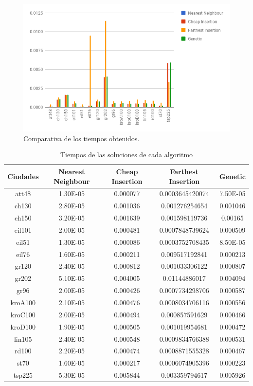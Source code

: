 \documentclass{article}
\begin{document}
\begin{figure}[H]
  \centering
  \includegraphics[width=1\textwidth]{tiempos.png}
  \caption{Comparativa de los tiempos obtenidos.}
\end{figure}

\begin{table}[h]
  \centering
  \begin{tabular}{|c|c|c|c|c|}
    \hline
		Ciudades & Nearest Neighbour & Cheap Insertion & Farthest Insertion & Genetic \\ \hline
		att48 & 1.30E-05 & 0.000077 & 0.0003645420074 & 7.50E-05 \\
		ch130 & 2.80E-05 & 0.001036 & 0.001276254654 & 0.001046 \\
		ch150 & 3.20E-05 & 0.001639 & 0.001598119736 & 0.00165 \\
		eil101 & 2.00E-05 & 0.000481 & 0.0007848739624 & 0.000509 \\
		eil51 & 1.30E-05 & 0.000086 & 0.0003752708435 & 8.50E-05 \\
		eil76 & 1.60E-05 & 0.000211 & 0.009517192841 & 0.000213 \\
		gr120 & 2.40E-05 & 0.000812 & 0.001033306122 & 0.000807 \\
		gr202 & 5.10E-05 & 0.004005 & 0.01144886017 & 0.004094 \\
		gr96 & 2.00E-05 & 0.000426 & 0.0007734298706 & 0.000587 \\
		kroA100 & 2.10E-05 & 0.000476 & 0.0008034706116 & 0.000556 \\
		kroC100 & 2.00E-05 & 0.000494 & 0.000857591629 & 0.000466 \\
		kroD100 & 1.90E-05 & 0.000505 & 0.001019954681 & 0.000472 \\
		lin105 & 2.40E-05 & 0.000548 & 0.0009834766388 & 0.000531 \\
		rd100 & 2.20E-05 & 0.000474 & 0.0008871555328 & 0.000467 \\
		st70 & 1.60E-05 & 0.000217 & 0.0006074905396 & 0.000223 \\
		tsp225 & 5.30E-05 & 0.005844 & 0.003359794617 & 0.005926 \\ \hline
	\end{tabular} 
  \caption{Tiempos de las soluciones de cada algoritmo}
\end{table}
\end{document}

